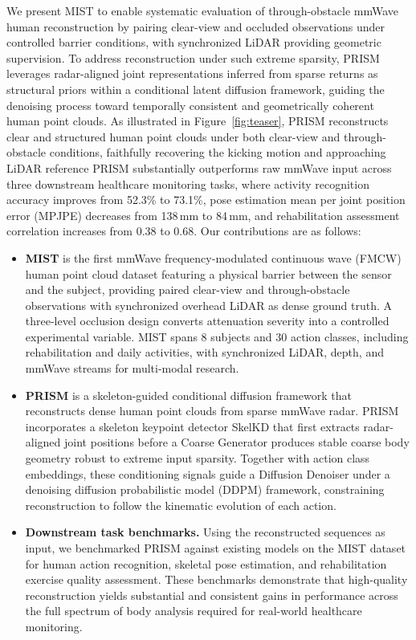 \documentclass{article}
\begin{document}
We present MIST to enable systematic evaluation of through-obstacle mmWave human reconstruction by pairing clear-view and occluded observations under controlled barrier conditions, with synchronized LiDAR providing geometric supervision. To address reconstruction under such extreme sparsity, PRISM leverages radar-aligned joint representations inferred from sparse returns as structural priors within a conditional latent diffusion framework, guiding the denoising process toward temporally consistent and geometrically coherent human point clouds. As illustrated in Figure~\ref{fig:teaser}, PRISM reconstructs clear and structured
human point clouds under both clear-view and through-obstacle conditions,
faithfully recovering the kicking motion and approaching LiDAR reference
PRISM substantially outperforms raw mmWave input across three downstream
healthcare monitoring tasks, where activity recognition accuracy improves from 52.3\% to 73.1\%, pose estimation mean per joint position error (MPJPE) decreases from 138\,mm to 84\,mm,
and rehabilitation assessment correlation increases from 0.38 to 0.68. Our contributions are as follows:

\begin{itemize}[leftmargin=1.5em,itemsep=2pt]

  \item \textbf{MIST} is the first mmWave frequency-modulated continuous wave (FMCW) human point cloud dataset featuring a physical barrier between the sensor and the subject, providing paired clear-view and through-obstacle observations with synchronized overhead LiDAR as dense ground truth.
  A three-level occlusion design converts attenuation severity into a
  controlled experimental variable.
  MIST spans 8 subjects and 30 action classes, including rehabilitation and daily activities, with synchronized LiDAR, depth, and mmWave streams for multi-modal research.

  \item \textbf{PRISM} is a skeleton-guided conditional diffusion
  framework that reconstructs dense human point clouds from sparse mmWave
  radar. PRISM incorporates a skeleton keypoint detector SkelKD that first extracts radar-aligned joint positions before a Coarse Generator produces stable coarse body geometry
  robust to extreme input sparsity.
  Together with action class embeddings, these conditioning signals guide a
  Diffusion Denoiser under a denoising diffusion probabilistic model (DDPM) framework, constraining
  reconstruction to follow the kinematic evolution of each action.


  \item \textbf{Downstream task benchmarks.}
  Using the reconstructed sequences as input, we benchmarked PRISM against existing models on the MIST dataset for human action recognition, skeletal pose estimation, and rehabilitation
  exercise quality assessment.
  These benchmarks demonstrate that high-quality reconstruction yields
  substantial and consistent gains in performance across the full spectrum of body analysis
  required for real-world healthcare monitoring.

\end{itemize}
\end{document}
